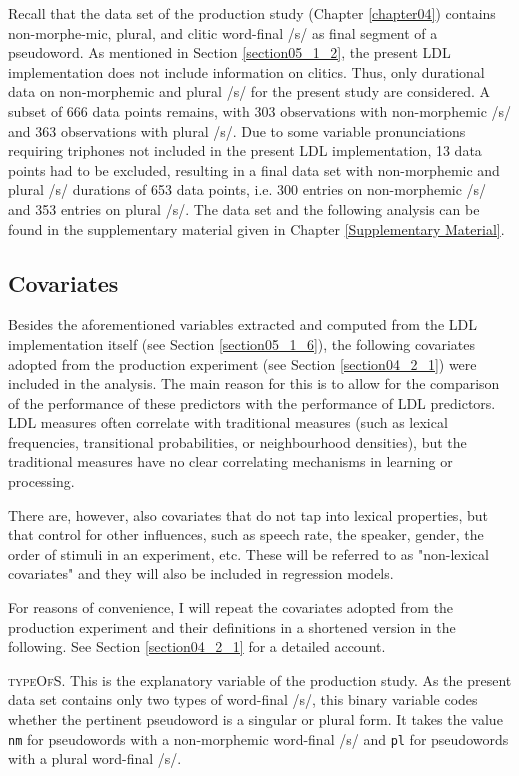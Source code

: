 Recall that the data set of the production study (Chapter \ref{chapter04}) contains non-morphe-mic, plural, and clitic word-final /s/ as final segment of a pseudoword. As mentioned in Section \ref{section05_1_2}, the present LDL implementation does not include information on clitics. Thus, only durational data on non-morphemic and plural /s/ for the present study are considered. A subset of 666 data points remains, with 303 observations with non-morphemic /s/ and 363 observations with plural /s/. Due to some variable pronunciations requiring triphones not included in the present LDL implementation, 13 data points had to be excluded, resulting in a final data set with non-morphemic and plural /s/ durations of 653 data points, i.e. 300 entries on non-morphemic /s/ and 353 entries on plural /s/. The data set and the following analysis can be found in the supplementary material given in Chapter \ref{Supplementary Material}.

\subsection{Covariates}\label{section05_2_1}

Besides the aforementioned variables extracted and computed from the LDL implementation itself (see Section \ref{section05_1_6}), the following covariates adopted from the production experiment (see Section \ref{section04_2_1}) were included in the analysis. The main reason for this is to allow for the comparison of the performance of these predictors with the performance of LDL predictors. LDL measures often correlate with traditional measures (such as lexical frequencies, transitional probabilities, or neighbourhood densities), but the traditional measures have no clear correlating mechanisms in learning or processing.

There are, however, also covariates that do not tap into lexical properties, but that control for other influences, such as speech rate, the speaker, gender, the order of stimuli in an experiment, etc. These will be referred to as "non-lexical covariates" and they will also be included in regression models. 

For reasons of convenience, I will repeat the covariates adopted from the production experiment and their definitions in a shortened version in the following. See Section \ref{section04_2_1} for a detailed account.

\textsc{typeOfS}. This is the explanatory variable of the production study. As the present data set contains only two types of word-final /s/, this binary variable codes whether the pertinent pseudoword is a singular or plural form. It takes the value \texttt{nm} for pseudowords with a non-morphemic word-final /s/ and \texttt{pl} for pseudowords with a plural word-final /s/.

